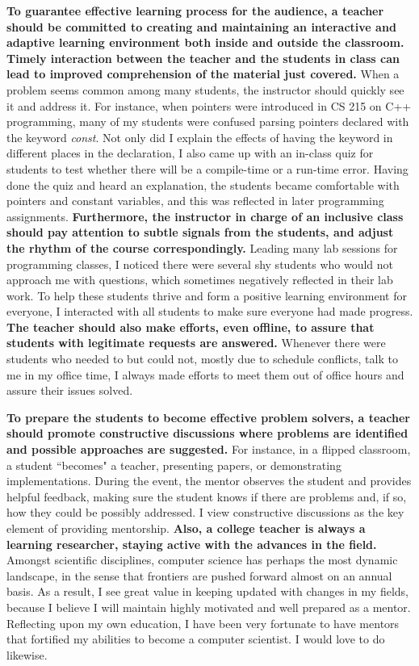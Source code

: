 \documentclass[12pt]{article}
\newcommand{\tit}[1]{\textit{#1}}
\newcommand{\tbf}[1]{\textbf{#1}}
\begin{document}
\tbf{To guarantee effective learning process for the audience, a teacher should be committed to
creating and maintaining an interactive and adaptive learning environment both inside
and outside the classroom.}
\tbf{Timely interaction between the teacher and the students in class can lead to improved
comprehension of the material just covered.}
When a problem seems common among many students, the instructor should quickly
see it and address it.
For instance, when pointers were introduced in CS 215 on C++ programming, 
many of my students were confused parsing pointers declared with the keyword \tit{const}.
Not only did I explain the effects of having the keyword in different places in the
declaration, I also came up with an in-class quiz for students to test whether there
will be a compile-time or a run-time error.
Having done the quiz and heard an explanation, the students became comfortable with
pointers and constant variables, and this was reflected in later programming assignments.
\tbf{Furthermore, the instructor in charge of an inclusive class should
pay attention to subtle signals from the students, 
and adjust the rhythm of the course correspondingly.}
Leading many lab sessions for programming classes,
I noticed there were several shy students who would not approach me with questions,
which sometimes negatively reflected in their lab work.
To help these students thrive and form a positive learning environment for everyone, 
I interacted with all students to make sure everyone had made progress.
\tbf{The teacher should also make efforts, even offline, to assure that students with legitimate
requests are answered.}
Whenever there were students who needed to but could not, mostly due to schedule conflicts,
talk to me in my office time, I always made efforts to meet them out of office hours and
assure their issues solved.

\tbf{To prepare the students to become effective problem solvers, a teacher should promote
constructive discussions where problems are identified and possible approaches are suggested.}
For instance, in a flipped classroom, a student ``becomes" a teacher, presenting papers,
or demonstrating implementations.  During the event, the mentor observes the student and
provides helpful feedback, making sure the student knows if there are problems and, if so,
how they could be possibly addressed.
I view constructive discussions as the key element of providing mentorship.
\tbf{Also, a college teacher is always a learning researcher, staying
active with the advances in the field.}
Amongst scientific disciplines,
computer science has perhaps the most dynamic landscape, in the sense that
frontiers are pushed forward almost on an annual basis.
As a result, I see great value in keeping updated with changes in my fields,
because I believe I will maintain highly motivated and well prepared as a mentor.
Reflecting upon my own education, I have been very fortunate to have mentors
that fortified my abilities to become a computer scientist.
I would love to do likewise.
\end{document}
